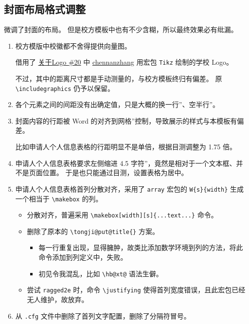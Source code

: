 \documentclass[../Main/thesis.tex]{subfiles}
\begin{document}
\subsection{封面布局格式调整}

微调了封面的布局。 但是校方模板中也有不少含糊，所以最终效果必有纰漏。

\begin{enumerate}
\item
  校方模版中校徽都不舍得提供向量图。

  借用了
  \href{https://github.com/marquistj13/TongjiThesis/issues/20}{关于Logo
  \#20} 中 \href{https://github.com/chennanzhang}{chennanzhang} 用宏包
  \texttt{Tikz} 绘制的学校 Logo。

  不过，其中的距离尺寸都是手动测量的，与校方模板终归有偏差。 原
  \texttt{\textbackslash{}includegraphics} 仍予以保留。
\item
  各个元素之间的间距没有出确定值，只是大概的换一行''、空半行''。
\item
  封面内容的行距被 Word
  的对齐到网格''控制，导致展示的样式与本模板有偏差。

  比如申请人个人信息表格的行距明显不是单倍，根据目测调整为 1.75 倍。
\item
  申请人个人信息表格要求左侧缩进 4.5
  字符''，竟然是相对于一个文本框、并不是页面位置。
  于是也只能通过目测，设置表格为居中。
\item
  申请人个人信息表格首列分散对齐，采用了 \texttt{array} 宏包的
  \texttt{W\{s\}\{width\}} 生成一个相当于
  \texttt{\textbackslash{}makebox} 的列。

  \begin{itemize}
  \item
    分散对齐，普遍采用
    \texttt{\textbackslash{}makebox[width][s]\{...text...\}}
    命令。
  \item
    删除了原本的 \texttt{\textbackslash{}tongji@put@title\{\}} 方案。

    \begin{itemize}
    \item
      每一行重复出现，显得臃肿，故类比添加数学环境到列的方法，将此命令添加到列定义中，失败。
    \item
      初见令我混乱，比如 \texttt{\textbackslash{}hb@xt@} 语法生僻。
    \end{itemize}
  \item
    尝试 \texttt{ragged2e} 时，命令 \texttt{\textbackslash{}justifying}
    使得首列宽度错误，且此宏包已经无人维护，故放弃。
  \end{itemize}
\item
  从 \texttt{.cfg} 文件中删除了首列文字配置，删除了分隔符冒号。


\end{enumerate}
\end{document}
